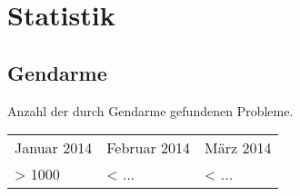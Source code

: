 %



\newpage



\section{Statistik}
\label{Abschnitt:Programmfehler:Statistik}





\subsection*{Gendarme}


Anzahl der durch Gendarme gefundenen Probleme.\\

\begin{longtable}{lll}

	  Januar 2014
	& Februar 2014
	& März 2014
	
	\\
	
      > 1000
	& < ...
	& < ...

\end{longtable}




